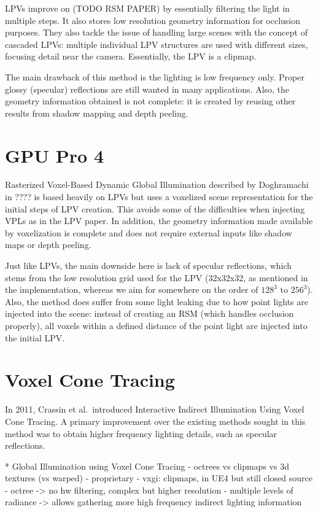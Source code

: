 LPVs improve on (TODO RSM PAPER) by essentially filtering the light in multiple steps. It also stores low resolution geometry information for occlusion purposes. They also tackle the issue of handling large scenes with the concept of cascaded LPVs: multiple individual LPV structures are used with different sizes, focusing detail near the camera. Essentially, the LPV is a clipmap.

The main drawback of this method is the lighting is low frequency only. Proper glossy (specular) reflections are still wanted in many applications. Also, the geometry information obtained is not complete: it is created by reusing other results from shadow mapping and depth peeling.

\section{GPU Pro 4}
Rasterized Voxel-Based Dynamic Global Illumination described by Doghramachi in ???? is based heavily on LPVs but uses a voxelized scene representation for the initial steps of LPV creation. This avoids some of the difficulties when injecting VPLs as in the LPV paper. In addition, the geometry information made available by voxelization is complete and does not require external inputs like shadow maps or depth peeling.

Just like LPVs, the main downside here is lack of specular reflections, which stems from the low resolution grid used for the LPV (32x32x32, as mentioned in the implementation, whereas we aim for somewhere on the order of $128^3$ to $256^3$). Also, the method does suffer from some light leaking due to how point lights are injected into the scene: instead of creating an RSM (which handles occlusion properly), all voxels within a defined distance of the point light are injected into the initial LPV.

\section{Voxel Cone Tracing}
In 2011, Crassin et al.\ introduced Interactive Indirect Illumination Using Voxel Cone Tracing. A primary improvement over the existing methods sought in this method was to obtain higher frequency lighting details, such as specular reflections.


* Global Illumination using Voxel Cone Tracing
    - octrees vs clipmaps vs 3d textures (vs warped)
    - proprietary
    - vxgi: clipmaps, in UE4 but still closed source
    - octree -> no hw filtering, complex but higher resolution
    - multiple levels of radiance -> allows gathering more high frequency indirect lighting information

\iffalse
* some common issues with other works (this could also go in intro)
- closed source
- implementation details matter -> difficult to understand from research or white papers
- highly variable performance based on unrelated things (OpenGL vs DirectX? modern OpenGL? mipmaps, normal maps, shading model, mesh optimizations, etc)
- research renderers or full game engines -> difficult to understand
\fi
